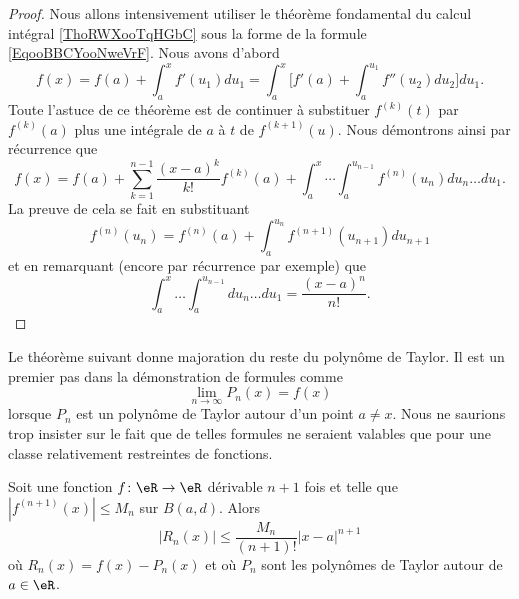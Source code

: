 \begin{proof}
	Nous allons intensivement utiliser le théorème fondamental du calcul intégral \ref{ThoRWXooTqHGbC} sous la forme de la formule \eqref{EqooBBCYooNweVrF}. Nous avons d'abord
	\begin{equation}
		f(x)=f(a)+\int_a^x f'(u_1)du_1=\int_a^x\big[ f'(a)+\int_a^{u_1}f''(u_2)du_2 \big]du_1.
	\end{equation}
	Toute l'astuce de ce théorème est de continuer à substituer \( f^{(k)}(t)\) par \( f^{(k)}(a)\) plus une intégrale de \( a\) à \( t\) de \( f^{(k+1)}(u)\). Nous démontrons ainsi par récurrence que
	\begin{equation}        \label{EQooOWJMooHATpMV}
		f(x)=f(a)+\sum_{k=1}^{n-1}\frac{ (x-a)^k }{ k! }f^{(k)}(a)+\int_a^x\cdots\int_a^{u_{n-1}}f^{(n)}(u_n)du_n\ldots du_1.
	\end{equation}
	La preuve de cela se fait en substituant
	\begin{equation}
		f^{(n)}(u_n)=f^{(n)}(a)+\int_{a}^{u_n}f^{(n+1)}(u_{n+1})du_{n+1}
	\end{equation}
	et en remarquant (encore par récurrence par exemple) que
	\begin{equation}
		\int_a^x\ldots \int_a^{u_{n-1}}du_n\ldots du_1=\frac{ (x-a)^n }{ n! }.
	\end{equation}
\end{proof}

Le théorème suivant donne majoration du reste du polynôme de Taylor. Il est un premier pas dans la démonstration de formules comme
\begin{equation}
	\lim_{n\to \infty} P_n(x)=f(x)
\end{equation}
lorsque \( P_n\) est un polynôme de Taylor autour d'un point \( a\neq x\). Nous ne saurions trop insister sur le fait que de telles formules ne seraient valables que pour une classe relativement restreintes de fonctions.
\begin{theorem}       \label{THOooEUVEooXZJTRL}
	Soit une fonction \( f\colon \eR\to \eR\) dérivable \( n+1\) fois et telle que \( | f^{(n+1)}(x) |\leq M_n\) sur \( B(a,d)\). Alors
	\begin{equation}
		| R_n(x) |\leq \frac{ M_n }{ (n+1)! }| x-a |^{n+1}
	\end{equation}
	où \( R_n(x)=f(x)-P_n(x)\) et où \( P_n\) sont les polynômes de Taylor autour de \( a\in \eR\).
\end{theorem}

